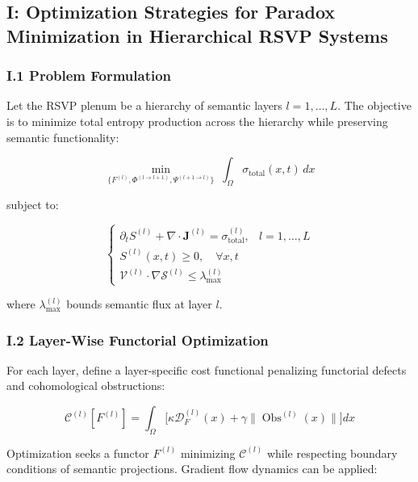 \documentclass[12pt]{article}
\theoremstyle{plain}
\begin{document}
\subsection*{I: Optimization Strategies for Paradox Minimization in Hierarchical RSVP Systems}

\subsubsection*{I.1 Problem Formulation}

Let the RSVP plenum be a hierarchy of semantic layers \(l = 1, \dots, L\). The objective is to minimize total entropy production across the hierarchy while preserving semantic functionality:

\begin{equation}
\min_{\{F^{(l)}, \Phi^{(l \to l+1)}, \Psi^{(l+1 \to l)}\}} \; \int_\Omega \sigma_{\mathrm{total}}(x,t) \, dx
\end{equation}

subject to:

\begin{equation}
\begin{cases} \partial_t S^{(l)} + \nabla \cdot \mathbf{J}^{(l)} = \sigma^{(l)}_{\mathrm{total}}, & l=1,\dots,L\\ S^{(l)}(x,t) \ge 0, \quad \forall x,t\\ \mathcal{V}^{(l)} \cdot \nabla \mathcal{S}^{(l)} \le \lambda_{\max}^{(l)} \end{cases}
\end{equation}

where \(\lambda_{\max}^{(l)}\) bounds semantic flux at layer \(l\).

\subsubsection*{I.2 Layer-Wise Functorial Optimization}

For each layer, define a layer-specific cost functional penalizing functorial defects and cohomological obstructions:

\begin{equation}
\mathcal{C}^{(l)}[F^{(l)}] = \int_\Omega \Big[ \kappa \mathcal{D}_F^{(l)}(x) + \gamma \|\operatorname{Obs}^{(l)}(x)\| \Big] dx
\end{equation}

Optimization seeks a functor \(F^{(l)}\) minimizing \(\mathcal{C}^{(l)}\) while respecting boundary conditions of semantic projections. Gradient flow dynamics can be applied:
\end{document}
